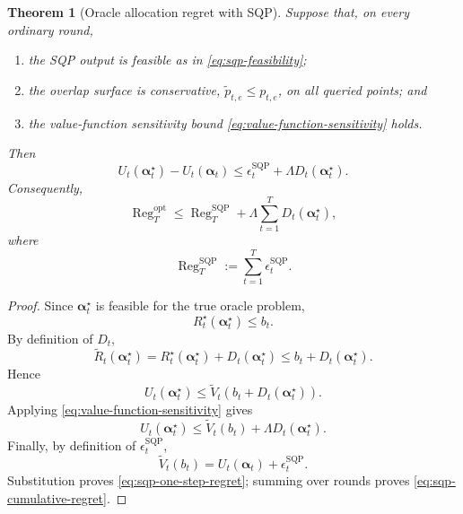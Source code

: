 \documentclass[11pt]{article}
\newtheorem{theorem}{Theorem}
\newcommand{\Reg}{\operatorname{Reg}}
\begin{document}
\begin{theorem}[Oracle allocation regret with SQP]
\label{thm:sqp-oracle-regret}
Suppose that, on every ordinary round,

\begin{enumerate}[leftmargin=*]
    \item the SQP output is feasible as in
    \eqref{eq:sqp-feasibility};
    \item the overlap surface is conservative,
    $\widetilde p_{t,e}\le p_{t,e}$, on all queried points; and
    \item the value-function sensitivity bound
    \eqref{eq:value-function-sensitivity} holds.
\end{enumerate}

Then
\begin{equation}
\boxed{
    U_t(\bm\alpha_t^\star)
    -
    U_t(\bm\alpha_t)
    \le
    \epsilon_t^{\mathrm{SQP}}
    +
    \Lambda
    D_t(\bm\alpha_t^\star).
}
\label{eq:sqp-one-step-regret}
\end{equation}
Consequently,
\begin{equation}
\boxed{
    \Reg_T^{\mathrm{opt}}
    \le
    \Reg_T^{\mathrm{SQP}}
    +
    \Lambda
    \sum_{t=1}^{T}
    D_t(\bm\alpha_t^\star),
}
\label{eq:sqp-cumulative-regret}
\end{equation}
where
\begin{equation}
    \Reg_T^{\mathrm{SQP}}
    :=
    \sum_{t=1}^{T}
    \epsilon_t^{\mathrm{SQP}}.
    \label{eq:sqp-regret-definition}
\end{equation}
\end{theorem}

\begin{proof}
Since $\bm\alpha_t^\star$ is feasible for the true oracle problem,
\[
    R_t^\star(\bm\alpha_t^\star)
    \le
    b_t.
\]
By definition of $D_t$,
\[
    \widetilde R_t(\bm\alpha_t^\star)
    =
    R_t^\star(\bm\alpha_t^\star)
    +
    D_t(\bm\alpha_t^\star)
    \le
    b_t+D_t(\bm\alpha_t^\star).
\]
Hence
\[
    U_t(\bm\alpha_t^\star)
    \le
    \widetilde V_t
    \left(
        b_t+D_t(\bm\alpha_t^\star)
    \right).
\]
Applying \eqref{eq:value-function-sensitivity} gives
\[
    U_t(\bm\alpha_t^\star)
    \le
    \widetilde V_t(b_t)
    +
    \Lambda D_t(\bm\alpha_t^\star).
\]
Finally, by definition of $\epsilon_t^{\mathrm{SQP}}$,
\[
    \widetilde V_t(b_t)
    =
    U_t(\bm\alpha_t)
    +
    \epsilon_t^{\mathrm{SQP}}.
\]
Substitution proves \eqref{eq:sqp-one-step-regret}; summing over rounds proves
\eqref{eq:sqp-cumulative-regret}.
\end{proof}
\end{document}
